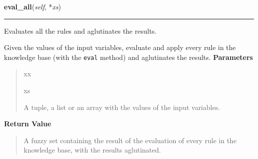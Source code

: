     \label{peach:fuzzy:control:Controller:eval_all}

    \vspace{0.5ex}

\hspace{.8\funcindent}\begin{boxedminipage}{\funcwidth}

    \raggedright \textbf{eval\_all}(\textit{self}, *\textit{xs})

    \vspace{-1.5ex}

    \rule{\textwidth}{0.5\fboxrule}
\setlength{\parskip}{2ex}

Evaluates all the rules and aglutinates the results.

Given the values of the input variables, evaluate and apply every rule
in the knowledge base (with the \texttt{eval} method) and aglutinates the
results.
\setlength{\parskip}{1ex}
      \textbf{Parameters}
      \vspace{-1ex}

      \begin{quote}
        \begin{Ventry}{xx}

          \item[xs]


A tuple, a list or an array with the values of the input variables.
        \end{Ventry}

      \end{quote}

      \textbf{Return Value}
    \vspace{-1ex}

      \begin{quote}

A fuzzy set containing the result of the evaluation of every rule in
the knowledge base, with the results aglutinated.
      \end{quote}

    \end{boxedminipage}

    \label{peach:fuzzy:control:Controller:__call__}

